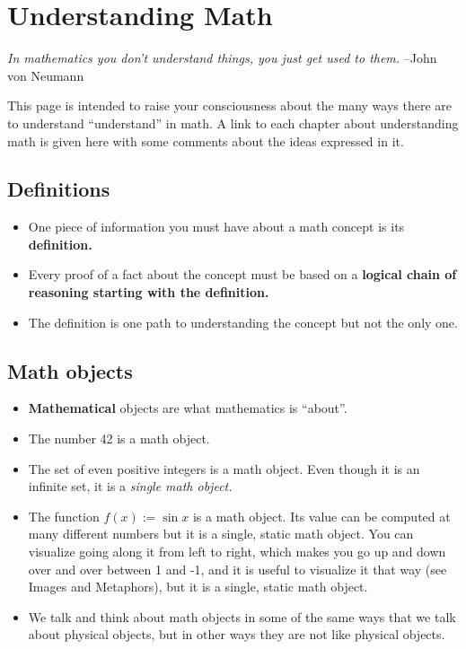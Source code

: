 \section{Understanding Math}
    \textit{In mathematics you don’t understand things, you just get used to them.}
    –John von Neumann

    This page is intended to raise your consciousness about the many ways there are
    to understand “understand” in math. A link to each chapter about understanding
    math is given here with some comments about the ideas expressed in it.

    \subsection{Definitions}
        \begin{itemize}
            \item{One piece of information you must have about a math concept is its \textbf{definition.}}

            \item{Every proof of a fact about the concept must be based on a
                \textbf{logical chain of reasoning starting with the definition.}}

            \item{The definition is one path to understanding the concept but not the only one.}
        \end{itemize}

    \subsection{Math objects}
        \begin{itemize}
            \item{\textbf{Mathematical} objects are what mathematics is “about”.}

            \item{The number 42 is a math object.}

            \item{The set of even positive integers is a math object.
                  Even though it is an infinite set, it is a \textit{single math object.}}

            \item{The function $f(x):={{\sin }}x$ is a math object. Its value can be
                  computed at many different numbers but it is a single, static
                  math object. You can visualize going along it from left to right,
                  which makes you go up and down over and over between 1 and -1, and it
                  is useful to visualize it that way (see Images and Metaphors), but it is a
                  single, static math object.}

            \item{We talk and think about math objects in some of the same ways
                  that we talk about physical objects, but in other ways they are
                  not like physical objects.}
        \end{itemize}
